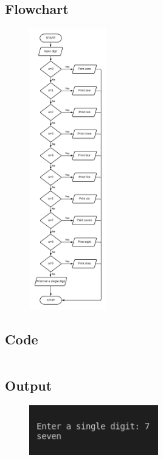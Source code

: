 \documentclass[12pt]{article}
\begin{document}
\subsection{Flowchart}
\begin{figure}[h]
    \centering
    \includegraphics[width=0.3\textwidth]{Flowchart08.png}
\end{figure}
\newpage
\subsection{Code}
\inputminted{c}{q8.c}
\subsection{Output}
\begin{figure}[h]
    \centering
    \includegraphics[width=0.5\textwidth]{8.png}
\end{figure}
\section{}
\end{document}

